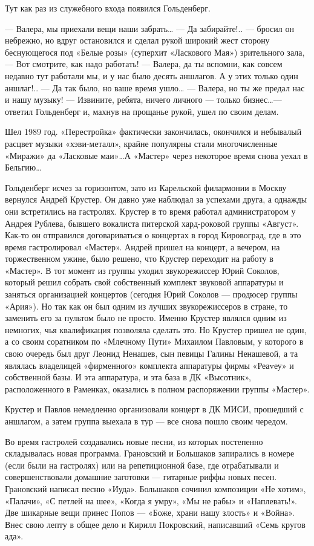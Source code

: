 \documentclass[16pt,a5paper]{book}
\begin{document}
Тут как раз из служебного входа появился Гольденберг.

— Валера, мы приехали вещи наши забрать\ldots
— Да забирайте!.. — бросил он небрежно, но вдруг остановился и сделал рукой широкий жест сторону беснующегося под «Белые
розы» (суперхит «Ласкового Мая») зрительного зала, — Вот смотрите, как надо работать!
— Валера, да ты вспомни, как совсем недавно тут работали мы, и у нас было десять аншлагов. А у этих только один
аншлаг!..
— Да так было, но ваше время ушло\ldots
— Валера, но ты же предал нас и нашу музыку!
— Извините, ребята, ничего личного — только бизнес\ldots — ответил Гольденберг и, махнув на прощанье рукой, ушел по
своим делам.

Шел 1989 год. «Перестройка» фактически закончилась, окончился и небывалый расцвет музыки «хэви-металл», крайне популярны
стали многочисленные «Миражи» да «Ласковые маи»\ldots А «Мастер» через некоторое время снова уехал в Бельгию\ldots

Гольденберг исчез за горизонтом, зато из Карельской филармонии в Москву вернулся Андрей Крустер. Он давно уже наблюдал
за успехами друга, а однажды они встретились на гастролях. Крустер в то время работал администратором у Андрея Рублева,
бывшего вокалиста питерской хард-роковой группы «Август». Как-то он отправился договариваться о концертах в город
Кировоград, где в это время гастролировал «Мастер». Андрей пришел на концерт, а вечером, на торжественном ужине, было
решено, что Крустер переходит на работу в «Мастер». В тот момент из группы уходил звукорежиссер Юрий Соколов, который
решил собрать свой собственный комплект звуковой аппаратуры и заняться организацией концертов (сегодня Юрий Соколов —
продюсер группы «Ария»). Но так как он был одним из лучших звукорежиссеров в стране, то заменить его за пультом было не
просто. Именно Крустер являлся одним из немногих, чья квалификация позволяла сделать это. Но Крустер пришел не один, а
со своим соратником по «Млечному Пути» Михаилом Павловым, у которого в свою очередь был друг Леонид Ненашев, сын певицы
Галины Ненашевой, а та являлась владелицей «фирменного» комплекта аппаратуры фирмы «Реаvеу» и собственной базы. И эта
аппаратура, и эта база в ДК «Высотник», расположенного в Раменках, оказались в полном распоряжении группы «Мастер».

Крустер и Павлов немедленно организовали концерт в ДК МИСИ, прошедший с аншлагом, а затем группа выехала в тур — все
снова пошло своим чередом.

Во время гастролей создавались новые песни, из которых постепенно складывалась новая программа. Грановский и Большаков
запирались в номере (если были на гастролях) или на репетиционной базе, где отрабатывали и совершенствовали домашние
заготовки — гитарные риффы новых песен. Грановский написал песню «Иуда». Большаков сочинил композиции «Не хотим»,
«Палачи», «С петлей на шее», «Когда я умру», «Мы не рабы» и «Наплевать!». Две шикарные вещи принес Попов — «Боже, храни
нашу злость» и «Война». Внес свою лепту в общее дело и Кирилл Покровский, написавший «Семь кругов ада».
\end{document}
